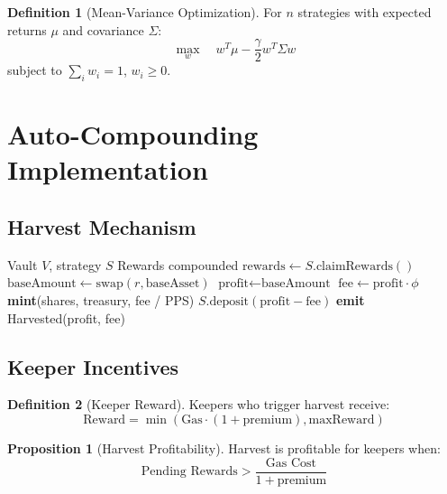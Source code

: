 \documentclass[11pt,a4paper]{article}
\theoremstyle{definition}
\newtheorem{definition}{Definition}
\newtheorem{proposition}{Proposition}
\begin{document}
\begin{definition}[Mean-Variance Optimization]
For $n$ strategies with expected returns $\mu$ and covariance $\Sigma$:
\begin{equation}
\max_w \quad w^T \mu - \frac{\gamma}{2} w^T \Sigma w
\end{equation}
subject to $\sum_i w_i = 1$, $w_i \geq 0$.
\end{definition}

\section{Auto-Compounding Implementation}

\subsection{Harvest Mechanism}

\begin{algorithm}
\caption{Harvest and Compound}
\begin{algorithmic}[1]
\Require Vault $V$, strategy $S$
\Ensure Rewards compounded
\State $\text{rewards} \gets S.\text{claimRewards}()$
\State $\text{baseAmount} \gets \text{swap}(r, \text{baseAsset})$
\EndFor
\State $\text{profit} \gets \text{baseAmount}$
\State $\text{fee} \gets \text{profit} \cdot \phi$
\State \textbf{mint}(shares, treasury, fee / PPS)
\State $S.\text{deposit}(\text{profit} - \text{fee})$
\State \textbf{emit} Harvested(profit, fee)
\end{algorithmic}
\end{algorithm}

\subsection{Keeper Incentives}

\begin{definition}[Keeper Reward]
Keepers who trigger harvest receive:
\begin{equation}
\text{Reward} = \min(\text{Gas} \cdot (1 + \text{premium}), \text{maxReward})
\end{equation}
\end{definition}

\begin{proposition}[Harvest Profitability]
Harvest is profitable for keepers when:
\begin{equation}
\text{Pending Rewards} > \frac{\text{Gas Cost}}{1 + \text{premium}}
\end{equation}
\end{proposition}
\end{document}
